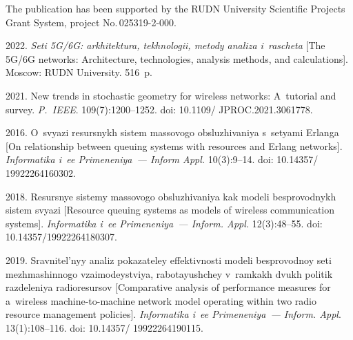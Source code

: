 



\vspace*{-12pt}

\Ack

\vspace*{-3pt}

\noindent
The publication has been supported by the RUDN University Scientific Projects 
Grant System, project No.\,025319-2-000.


  \begin{multicols}{2}

\renewcommand{\bibname}{\protect\rmfamily References}

{\small\frenchspacing
 {%
 \begin{thebibliography}{99} 
2022.
\textit{Seti 5G/6G: arkhitektura, tekhnologii, metody analiza i~rascheta}
[The 5G/6G networks: Architecture, technologies, analysis methods, and calculations].
Moscow: RUDN University. 516~p.

2021.
New trends in stochastic geometry for wireless networks: A~tutorial and survey.
\textit{P.~IEEE}. 109(7):1200--1252.
doi: 10.1109/ JPROC.2021.3061778.

2016. O~svyazi resursnykh sistem massovogo obsluzhivaniya s~setyami Erlanga
[On relationship between queuing systems with resources and Erlang networks].
\textit{Informatika i~ee Primeneniya~--- Inform Appl.} 10(3):9--14.
doi: 10.14357/ 19922264160302.

2018. Resursnye sistemy massovogo obsluzhivaniya kak modeli besprovodnykh sistem svyazi
[Resource queuing systems as models of wireless communication systems].
\textit{Informatika i~ee Primeneniya~--- Inform. Appl.} 12(3):48--55.
doi: 10.14357/19922264180307.



2019. Sravnitel'nyy analiz pokazateley effektivnosti modeli besprovodnoy seti mezhmashinnogo 
vzaimodeystviya, rabotayushchey v~ramkakh dvukh politik razdeleniya radioresursov
[Comparative analysis of performance measures for a~wireless machine-to-machine 
network model operating within two radio resource management policies].
\textit{Informatika i~ee Primeneniya~--- Inform. Appl}. 13(1):108--116.
doi: 10.14357/ 19922264190115.



\end{thebibliography}}}
\end{multicols}
